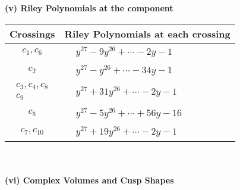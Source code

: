 \documentclass[1p]{elsarticle_modified}
\theoremstyle{definition}
\begin{document}
\newpage\renewcommand{\arraystretch}{1}
\flushleft \textbf{(v) Riley Polynomials at the component}\newline \\
\begin{tabular}{m{50pt}|m{274pt}}
Crossings & \hspace{64pt}Riley Polynomials at each crossing \\
\hline $$\begin{aligned}c_{1},c_{6}\end{aligned}$$&$\begin{aligned}
&y^{27}-9 y^{26}+\cdots-2 y-1
\end{aligned}$\\
\hline $$\begin{aligned}c_{2}\end{aligned}$$&$\begin{aligned}
&y^{27}- y^{26}+\cdots-34 y-1
\end{aligned}$\\
\hline $$\begin{aligned}c_{3},c_{4},c_{8}\\c_{9}\end{aligned}$$&$\begin{aligned}
&y^{27}+31 y^{26}+\cdots-2 y-1
\end{aligned}$\\
\hline $$\begin{aligned}c_{5}\end{aligned}$$&$\begin{aligned}
&y^{27}-5 y^{26}+\cdots+56 y-16
\end{aligned}$\\
\hline $$\begin{aligned}c_{7},c_{10}\end{aligned}$$&$\begin{aligned}
&y^{27}+19 y^{26}+\cdots-2 y-1
\end{aligned}$\\
\hline
\end{tabular}\\~\\
\newpage\flushleft \textbf{(vi) Complex Volumes and Cusp Shapes}
\end{document}

